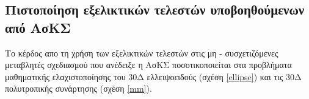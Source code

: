 
\subsection{Πιστοποίηση εξελικτικών τελεστών υποβοηθούμενων από ΑσΚΣ}
Το κέρδος απο τη χρήση των εξελικτικών τελεστών στις μη - συσχετιζόμενες μεταβλητές σχεδιασμού που ανέδειξε η ΑσΚΣ  ποσοτικοποιείται στα προβλήματα μαθηματικής ελαχιστοποίησης του 30Δ ελλειψοειδούς (σχέση \ref{ellipse}) και τις 30Δ πολυτροπικής συνάρτησης (σχέση \ref{mm}). 



